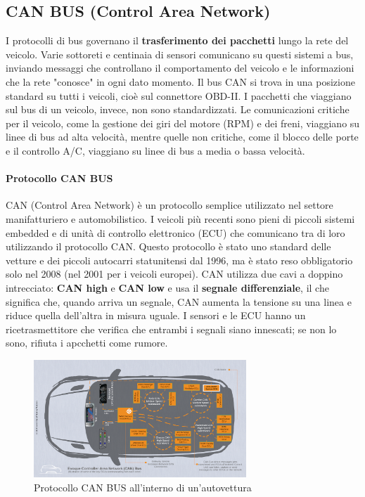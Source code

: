 \documentclass[12pt, a4paper, italian]{report}
\numberwithin{figure}{chapter}
\numberwithin{table}{chapter}
\begin{document}
\subsection{CAN BUS (Control Area Network)}
I protocolli di bus governano il \textbf{trasferimento dei pacchetti} lungo la rete del veicolo. Varie sottoreti e centinaia di sensori comunicano su questi sistemi a bus, inviando messaggi che controllano il comportamento del veicolo e le informazioni che la rete "conosce" in ogni dato momento.
Il bus CAN si trova in una posizione standard su tutti i veicoli, cioè sul connettore OBD-II. I pacchetti che viaggiano sul bus di un veicolo, invece, non sono standardizzati. Le comunicazioni critiche per il veicolo, come la gestione dei giri del motore (RPM) e dei freni, viaggiano su linee di bus ad alta velocità, mentre quelle non critiche, come il blocco delle porte e il controllo A/C, viaggiano su linee di bus a media o bassa velocità.
\paragraph{Protocollo CAN BUS} CAN (Control Area Network) è un protocollo semplice utilizzato nel settore manifatturiero e automobilistico. I veicoli più recenti sono pieni di piccoli sistemi embedded e di unità di controllo elettronico (ECU) che comunicano tra di loro utilizzando il protocollo CAN. Questo protocollo è stato uno standard delle vetture e dei piccoli autocarri statunitensi dal 1996, ma è stato reso obbligatorio solo nel 2008 (nel 2001 per i veicoli europei). CAN utilizza due cavi a doppino intrecciato: \textbf{CAN high} e \textbf{CAN low} e usa il \textbf{segnale differenziale}, il che significa che, quando arriva un segnale, CAN aumenta la tensione su una linea e riduce quella dell'altra in misura uguale. I sensori e le ECU hanno un ricetrasmettitore che verifica che entrambi i segnali siano innescati; se non lo sono, rifiuta i apcchetti come rumore. 

\begin{figure}[h]
  \centering
  \includegraphics[width=8cm]{CAN_auto.png}
  \caption{Protocollo CAN BUS all'interno di un'autovettura}
  \label{fig:Protocallo CAN-BUS}
\end{figure}
\end{document}
